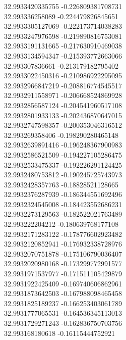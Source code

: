 {32.9933420335755	-0.226809381708731\\
32.993336258089	-0.224479826845651\\
32.9933305127069	-0.222173714038283\\
32.9933247976598	-0.219890816753081\\
32.9933191131665	-0.217630910469038\\
32.9933134594347	-0.215393772663066\\
32.993307836661	-0.213179182795402\\
32.9933022450316	-0.210986922295095\\
32.9932966847219	-0.208816774545517\\
32.9932911558971	-0.206668524869928\\
32.9932856587124	-0.204541960517108\\
32.9932801933133	-0.202436870647015\\
32.9932747598357	-0.200353046316512\\
32.993269358406	-0.198290280465148\\
32.9932639891416	-0.196248367900983\\
32.9932586521509	-0.194227105286475\\
32.9932533475337	-0.192226291124425\\
32.9932480753812	-0.190245725743973\\
32.9932428357763	-0.18828521128665\\
32.9932376287939	-0.186344551692496\\
32.9932324545008	-0.184423552686231\\
32.9932273129563	-0.182522021763489\\
32.993222204212	-0.180639768177108\\
32.9932171283122	-0.178776602923482\\
32.9932120852941	-0.176932338728976\\
32.9932070751878	-0.175106790036407\\
32.9932020980168	-0.173299772991577\\
32.9931971537977	-0.171511105429879\\
32.9931922425409	-0.169740606862961\\
32.9931873642503	-0.167988098465458\\
32.9931825189237	-0.166253403061789\\
32.9931777065531	-0.164536345113013\\
32.9931729271243	-0.162836750703756\\
32.993168180618	-0.16115444752921\\
}
